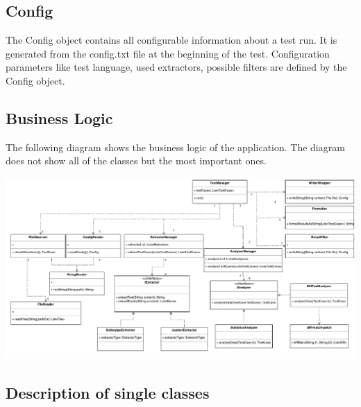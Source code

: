 \subsection{Config}
The Config object contains all configurable information about a test run. It is generated from the config.txt file at the beginning of the test. Configuration parameters like test language, used extractors, possible filters are defined by the Config object.
\begin{landscape}

\subsection{Business Logic}
\label{subsec:Business Logic}

The following diagram shows the business logic of the application. The diagram does not show all of the classes but the most important ones. 

\includegraphics[width=23cm]{Figures/architecutre.pdf}


\end{landscape}



\pagebreak
\subsection{Description of single classes}

